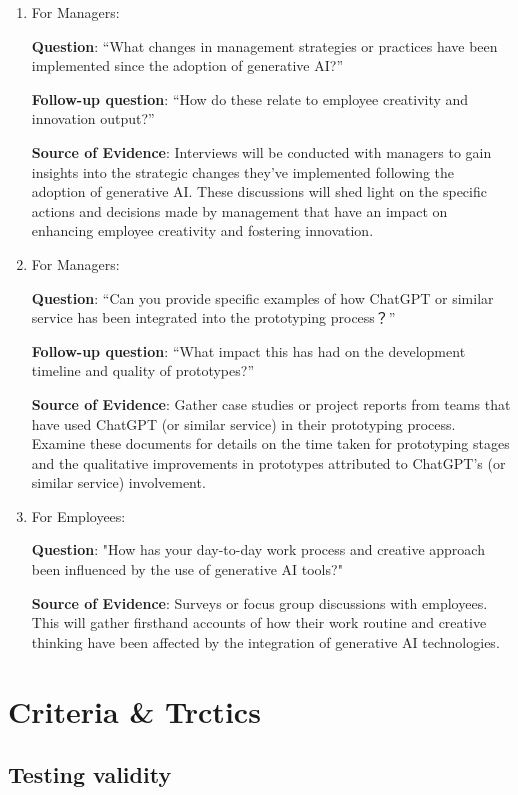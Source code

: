 \documentclass[UTF8,a4paper,AutoFakeBold,AutoFakeSlant]{article}
\begin{document}
\begin{enumerate}
    \item For Managers:

    \textbf{Question}: “What changes in management strategies or practices have been implemented since the adoption of generative AI?”
    
    \textbf{Follow-up question}: “How do these relate to employee creativity and innovation output?”
    
    \textbf{Source of Evidence}: Interviews will be conducted with managers to gain insights into the strategic changes they've implemented following the adoption of generative AI. These discussions will shed light on the specific actions and decisions made by management that have an impact on enhancing employee creativity and fostering innovation.
    \item For Managers:

    \textbf{Question}: “Can you provide specific examples of how ChatGPT or similar service has been integrated into the prototyping process？”
    
    \textbf{Follow-up question}: “What impact this has had on the development timeline and quality of prototypes?”
    
    \textbf{Source of Evidence}: Gather case studies or project reports from teams that have used ChatGPT (or similar service) in their prototyping process. Examine these documents for details on the time taken for prototyping stages and the qualitative improvements in prototypes attributed to ChatGPT's (or similar service) involvement.
    \item For Employees:

    \textbf{Question}: "How has your day-to-day work process and creative approach been influenced by the use of generative AI tools?"
    
    \textbf{Source of Evidence}: Surveys or focus group discussions with employees. This will gather firsthand accounts of how their work routine and creative thinking have been affected by the integration of generative AI technologies.
\end{enumerate}


\section{Criteria \& Trctics}

\subsection{Testing validity}
\end{document}
